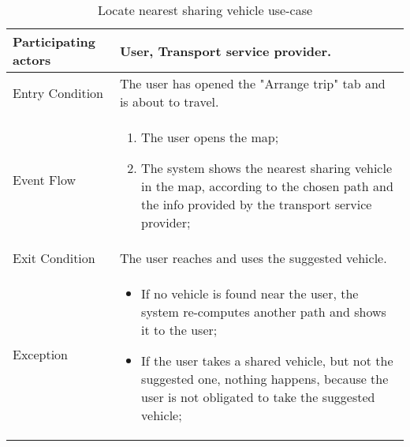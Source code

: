 \begin{table}[H]
	\begin{center}
		\begin{tabular}{ | p{} | p{} | }
		\hline
		Participating actors &  User, Transport service provider.\\
		\hline
		Entry Condition & The user has opened the "Arrange trip" tab and is about to travel.\\
		\hline
		Event Flow & 
			\begin{enumerate}
				\item The user opens the map;
				\item The system shows the nearest sharing vehicle in the map, according to the chosen path and the info provided by the transport service provider;
			\end{enumerate} \\
		\hline
		Exit Condition & The user reaches and uses the suggested vehicle. \\
		\hline
		Exception &
				\begin{itemize}
   					\item If no vehicle is found near the user, the system re-computes another path and shows it to the user;
   					\item If the user takes a shared vehicle, but not the suggested one, nothing happens, because the user is not obligated to take the suggested vehicle;
   				\end{itemize} \\ 
		\hline
		\end{tabular}
	\end{center}
	\caption{Locate nearest sharing vehicle use-case}
\end{table}
